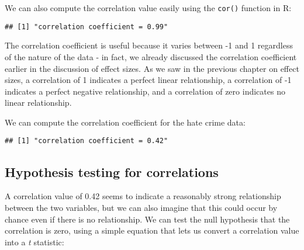 \documentclass[]{book}
\newenvironment{Shaded}{\begin{snugshade}}{\end{snugshade}}
\newcommand{\KeywordTok}[1]{\textcolor[rgb]{0.13,0.29,0.53}{\textbf{#1}}}
\newcommand{\StringTok}[1]{\textcolor[rgb]{0.31,0.60,0.02}{#1}}
\newcommand{\CommentTok}[1]{\textcolor[rgb]{0.56,0.35,0.01}{\textit{#1}}}
\newcommand{\OperatorTok}[1]{\textcolor[rgb]{0.81,0.36,0.00}{\textbf{#1}}}
\newcommand{\NormalTok}[1]{#1}
\theoremstyle{definition}
\theoremstyle{definition}
\theoremstyle{definition}
\theoremstyle{remark}
\begin{document}
We can also compute the correlation value easily using the
\texttt{cor()} function in R:

\begin{Shaded}
\end{Shaded}

\begin{verbatim}
## [1] "correlation coefficient = 0.99"
\end{verbatim}

The correlation coefficient is useful because it varies between -1 and 1
regardless of the nature of the data - in fact, we already discussed the
correlation coefficient earlier in the discussion of effect sizes. As we
saw in the previous chapter on effect sizes, a correlation of 1
indicates a perfect linear relationship, a correlation of -1 indicates a
perfect negative relationship, and a correlation of zero indicates no
linear relationship.

We can compute the correlation coefficient for the hate crime data:

\begin{Shaded}
\end{Shaded}

\begin{verbatim}
## [1] "correlation coefficient = 0.42"
\end{verbatim}

\subsection{Hypothesis testing for
correlations}\label{hypothesis-testing-for-correlations}

A correlation value of 0.42 seems to indicate a reasonably strong
relationship between the two variables, but we can also imagine that
this could occur by chance even if there is no relationship. We can test
the null hypothesis that the correlation is zero, using a simple
equation that lets us convert a correlation value into a \emph{t}
statistic:
\end{document}
